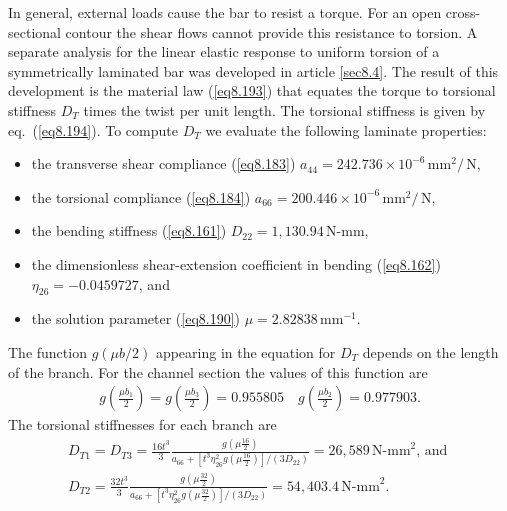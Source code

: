 \documentclass{AeroStructure-ERJohnson}
\begin{document}
\begin{example*}
In general, external loads cause the bar to
resist a torque. For an open cross-sectional contour the shear
flows cannot provide this resistance to torsion. A separate
analysis for the linear elastic response to uniform torsion of a
symmetrically laminated bar was developed in article \ref{sec8.4}. The
result of this development is the material law (\ref{eq8.193})
that equates the torque to torsional stiffness $D_{T}$ times the
twist per unit length. The torsional stiffness is given by
eq.~(\ref{eq8.194}). To compute $D_{T}$ we evaluate the following
laminate properties:
\begin{itemize}
\item the transverse shear compliance (\ref{eq8.183})
$a_{44}=242.736 \times 10^{-6}\,\mathrm{mm}^{2}/\,\mathrm{N}$,

\item the torsional compliance (\ref{eq8.184}) $a_{66}=200.446
\times 10^{-6}\,\mathrm{mm}^{2}/\,\mathrm{N}$,

\item the bending
stiffness (\ref{eq8.161}) $D_{22}=1,130.94\,\textrm{N-mm}$,

\item the dimensionless
shear-extension coefficient in bending (\ref{eq8.162})
$\eta_{26}=-0.0459727$, and

\item the solution parameter
(\ref{eq8.190}) $\mu=2.82838\,\mathrm{mm}^{-1}$.
\end{itemize}
The function $g(\mu b/ 2)$ appearing in the equation for $D_{T}$ depends on
the length of the branch. For the channel section the values of
this function are
\begin{align}
g\left(\frac{\mu b_{1}}{2}\right)=g\left(\frac{\mu
b_{3}}{2}\right)=0.955805 \quad g\left(\frac{\mu
b_{2}}{2}\right)=0.977903.\tag{x}\label{ex8.5x}
\end{align}
The torsional stiffnesses for each
branch are
\begin{gather}
D_{T 1}=D_{T 3}=\frac{16 t^{3}}{3} \frac{g\left(\mu
\frac{16}{2}\right)}{a_{66}+\left[t^{3} \eta_{26}^{2} g\left(\mu
\frac{16}{2}\right)\right]/\left(3 D_{22}\right)}=26{,}589\,\textrm{N-mm}^{2}\mbox{, and }\tag{y}\label{ex8.5y}\\
D_{T 2}=\frac{32t^{3}}{3} \frac{g\left(\mu \frac{32}{2}\right)}{a_{66}+\left[t^{3}
\eta_{26}^{2} g\left(\mu \frac{32}{2}\right)\right]/\left(3
D_{22}\right)}=54{,}403.4\,\textrm{N-mm}^{2}.\tag{z}\label{ex8.5z}
\end{gather}
\vspace*{3pt}
\clearpage


\end{example*}
\end{document}
